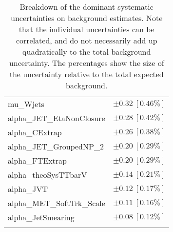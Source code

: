 \begin{table}
\begin{center}
\begin{tabular*}{\textwidth}{@{\extracolsep{\fill}}lc}
mu\_Wjets         & $\pm 0.32\ [0.46\%] $       \\
alpha\_JET\_EtaNonClosure         & $\pm 0.28\ [0.42\%] $       \\
alpha\_CExtrap         & $\pm 0.26\ [0.38\%] $       \\
alpha\_JET\_GroupedNP\_2         & $\pm 0.20\ [0.29\%] $       \\
alpha\_FTExtrap         & $\pm 0.20\ [0.29\%] $       \\
alpha\_theoSysTTbarV         & $\pm 0.14\ [0.21\%] $       \\
alpha\_JVT         & $\pm 0.12\ [0.17\%] $       \\
alpha\_MET\_SoftTrk\_Scale         & $\pm 0.11\ [0.16\%] $       \\
alpha\_JetSmearing         & $\pm 0.08\ [0.12\%] $       \\
\noalign{\smallskip}\hline\noalign{\smallskip}
\end{tabular*}
\end{center}
\caption[Breakdown of uncertainty on background estimates]{
Breakdown of the dominant systematic uncertainties on background estimates.
Note that the individual uncertainties can be correlated, and do not necessarily add up quadratically to 
the total background uncertainty. The percentages show the size of the uncertainty relative to the total expected background.
\label{table.results.bkgestimate.uncertainties.VRTopAT0}}
\end{table}
%